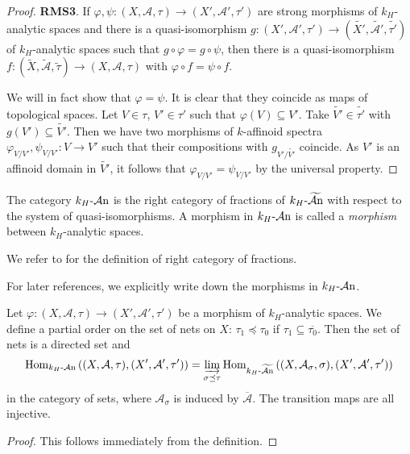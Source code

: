 \begin{proof}
    \textbf{RMS3}. If $\varphi,\psi:(X,\mathcal{A},\tau)\rightarrow (X',\mathcal{A}',\tau')$ are strong morphisms of $k_H$-analytic spaces and there is a quasi-isomorphism $g:(X',\mathcal{A}',\tau')\rightarrow (\widetilde{X'},\widetilde{\mathcal{A}'},\widetilde{\tau'})$ of $k_H$-analytic spaces such that $g\circ \varphi=g\circ \psi$, then there is a quasi-isomorphism $f:(\tilde{X},\tilde{\mathcal{A}},\tilde{\tau})\rightarrow (X,\mathcal{A},\tau)$ with $\varphi\circ f=\psi\circ f$.

    We will in fact show that $\varphi=\psi$. It is clear that they coincide as maps of topological spaces. Let $V\in \tau$, $V'\in \tau'$ such that $\varphi(V)\subseteq V'$. Take $\widetilde{V'}\in \widetilde{\tau'}$ with $g(V')\subseteq \widetilde{V'}$. Then we have two morphisms of $k$-affinoid spectra $\varphi_{V/V'},\psi_{V/V'}:V\rightarrow V'$ such that their compositions with $g_{V'/\widetilde{V'}}$ coincide.  As $V'$ is an affinoid domain in $\widetilde{V'}$, it follows that $\varphi_{V/V'}=\psi_{V/V'}$ by the universal property.
\end{proof}


\begin{definition}
    The category $k_H\text{-}\mathcal{A}\mathrm{n}$ is the right category of fractions of $k_H\text{-}\widetilde{\mathcal{A}\mathrm{n}}$ with respect to the system of quasi-isomorphisms.  A morphism in $k_H\text{-}\mathcal{A}\mathrm{n}$ is called a \emph{morphism} between $k_H$-analytic spaces.
\end{definition}
We refer to \cite[\href{https://stacks.math.columbia.edu/tag/04VB}{Tag 04VB}]{stacks-project} for the definition of right category of fractions. 

For later references, we explicitly write down the morphisms in $k_H\text{-}\mathcal{A}\mathrm{n}$. 
\begin{lemma}
    Let $\varphi:(X,\mathcal{A},\tau)\rightarrow (X',\mathcal{A}',\tau')$ be a morphism of $k_H$-analytic spaces. We define a partial order on the set of nets on $X$: $\tau_1\preceq \tau_0$ if $\tau_1\subseteq \overline{\tau_0}$. Then the set of nets is a directed set and
    \[
        \operatorname{Hom}_{k_H\text{-}\mathcal{A}\mathrm{n}}\left((X,\mathcal{A},\tau),(X',\mathcal{A}',\tau') \right)=\varinjlim_{\sigma\preceq \tau}\operatorname{Hom}_{k_H\text{-}\widetilde{\mathcal{A}\mathrm{n}}}\left((X,\mathcal{A}_{\sigma},\sigma),(X',\mathcal{A}',\tau') \right)
    \]
    in the category of sets, where $\mathcal{A}_{\sigma}$ is induced by $\overline{\mathcal{A}}$. The transition maps are all injective.
\end{lemma}
\begin{proof}
    This follows immediately from the definition.
\end{proof}

